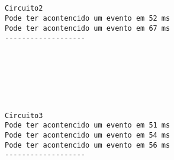 \documentclass[11pt]{article}
\begin{document}
    \begin{center}
    \end{center}
    { \hspace*{\fill} \\}
    
    \begin{center}
    \end{center}
    { \hspace*{\fill} \\}
    
    \begin{Verbatim}[commandchars=\\\{\}]
Circuito2
Pode ter acontencido um evento em 52 ms
Pode ter acontencido um evento em 67 ms
-------------------
    \end{Verbatim}

    \begin{center}
    \end{center}
    { \hspace*{\fill} \\}
    
    \begin{center}
    \end{center}
    { \hspace*{\fill} \\}
    
    \begin{center}
    \end{center}
    { \hspace*{\fill} \\}
    
    \begin{Verbatim}[commandchars=\\\{\}]
Circuito3
Pode ter acontencido um evento em 51 ms
Pode ter acontencido um evento em 54 ms
Pode ter acontencido um evento em 56 ms
-------------------
    \end{Verbatim}

    \begin{center}
    \end{center}
    { \hspace*{\fill} \\}
    
\end{document}
